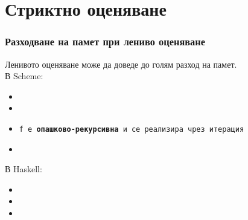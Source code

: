 \documentclass{beamer}
\begin{document}
\section{Стриктно оценяване}

\begin{frame}
  \frametitle{Разходване на памет при лениво оценяване}

  Ленивото оценяване може да доведе до голям разход на памет.\\[1em]\pause
  В Scheme:
  \lstset{language=Scheme}
  \begin{itemize}[<+->]
  \item {}
  \item {}
  \item \tt f е \textbf{опашково-рекурсивна} и се реализира чрез итерация
  \item {}
  \end{itemize}
  \onslide<+->
  В Haskell:
  \lstset{language=Haskell}
  \begin{itemize}[<+->]
  \item {}
  \item {}
  \item {}
  \end{itemize}
\end{frame}
\end{document}
